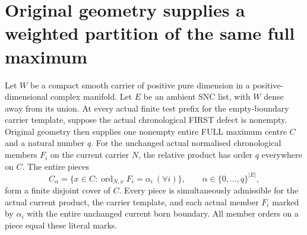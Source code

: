 \section{Original geometry supplies a weighted partition of the same full maximum}

\begin{theorem}
\label{hir:sharp-original-full-maximum-weighted-partition}
Let $W$ be a compact smooth carrier of positive pure dimension in a
positive-dimensional complex manifold. Let $E$ be an ambient SNC list,
with $W$ dense away from its union. At every actual finite test prefix
for the empty-boundary carrier template, suppose the actual
chronological FIRST defect is nonempty. Original geometry then supplies
one nonempty entire FULL maximum centre $C$ and a natural number $q$.
For the unchanged actual normalised chronological members $F_i$ on
the current carrier $N$, the relative product has order $q$ everywhere
on $C$. The entire pieces
\[
 C_\alpha=\{x\in C: \operatorname{ord}_{N,x}F_i=\alpha_i\ (\forall i)\},
 \qquad \alpha\in\{0,\ldots,q\}^{|E|},
\]
form a finite disjoint cover of $C$. Every piece is simultaneously
admissible for the actual current product, the carrier template, and
each actual member $F_i$ marked by $\alpha_i$ with the entire unchanged
current born boundary. All member orders on a piece equal these literal
marks.
\leanok
\end{theorem}
